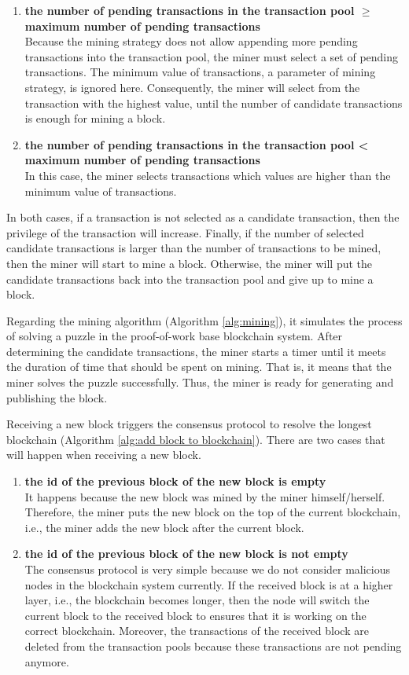 \begin{enumerate}
    \item \textbf{the number of pending transactions in the transaction pool $\geq$ maximum number of pending transactions} \\
        Because the mining strategy does not allow appending more pending transactions into the transaction pool, the miner must select a set of pending transactions. The minimum value of transactions, a parameter of mining strategy, is ignored here. Consequently, the miner will select from the transaction with the highest value, until the number of candidate transactions is enough for mining a block.
    \item \textbf{the number of pending transactions in the transaction pool < maximum number of pending transactions} \\
        In this case, the miner selects transactions which values are higher than the minimum value of transactions.
\end{enumerate}

In both cases, if a transaction is not selected as a candidate transaction, then the privilege of the transaction will increase. Finally, if the number of selected candidate transactions is larger than the number of transactions to be mined, then the miner will start to mine a block. Otherwise, the miner will put the candidate transactions back into the transaction pool and give up to mine a block.

Regarding the mining algorithm (Algorithm \ref{alg:mining}), it simulates the process of solving a puzzle in the proof-of-work base blockchain system. After determining the candidate transactions, the miner starts a timer until it meets the duration of time that should be spent on mining. That is, it means that the miner solves the puzzle successfully. Thus, the miner is ready for generating and publishing the block.

Receiving a new block triggers the consensus protocol to resolve the longest blockchain (Algorithm \ref{alg:add block to blockchain}). There are two cases that will happen when receiving a new block.

\begin{enumerate}
    \item \textbf{the id of the previous block of the new block is empty} \\
        It happens because the new block was mined by the miner himself/herself. Therefore, the miner puts the new block on the top of the current blockchain, i.e., the miner adds the new block after the current block.
    \item \textbf{the id of the previous block of the new block is not empty} \\
        The consensus protocol is very simple because we do not consider malicious nodes in the blockchain system currently. If the received block is at a higher layer, i.e., the blockchain becomes longer, then the node will switch the current block to the received block to ensures that it is working on the correct blockchain. Moreover, the transactions of the received block are deleted from the transaction pools because these transactions are not pending anymore.
\end{enumerate}

